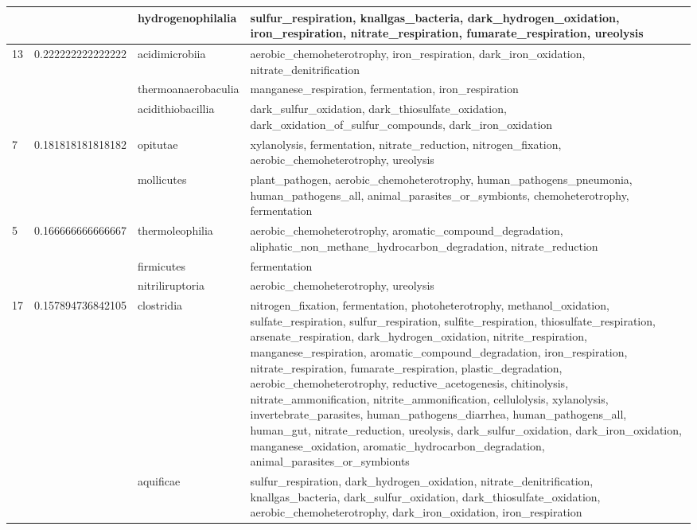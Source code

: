 \documentclass{article}
\begin{document}
\begin{longtable}{|l|c|l|>{\raggedright\arraybackslash}p{6cm}|}
\cline{3-4}
 &  & hydrogenophilalia & sulfur\_respiration, knallgas\_bacteria, dark\_hydrogen\_oxidation, iron\_respiration, nitrate\_respiration, fumarate\_respiration, ureolysis\\
\hline
13 & 0.222222222222222 & acidimicrobiia & aerobic\_chemoheterotrophy, iron\_respiration, dark\_iron\_oxidation, nitrate\_denitrification\\
\cline{3-4}
 &  & thermoanaerobaculia & manganese\_respiration, fermentation, iron\_respiration\\
\cline{3-4}
 &  & acidithiobacillia & dark\_sulfur\_oxidation, dark\_thiosulfate\_oxidation, dark\_oxidation\_of\_sulfur\_compounds, dark\_iron\_oxidation\\
\hline
7 & 0.181818181818182 & opitutae & xylanolysis, fermentation, nitrate\_reduction, nitrogen\_fixation, aerobic\_chemoheterotrophy, ureolysis\\
\cline{3-4}
 &  & mollicutes & plant\_pathogen, aerobic\_chemoheterotrophy, human\_pathogens\_pneumonia, human\_pathogens\_all, animal\_parasites\_or\_symbionts, chemoheterotrophy, fermentation\\
\hline
5 & 0.166666666666667 & thermoleophilia & aerobic\_chemoheterotrophy, aromatic\_compound\_degradation, aliphatic\_non\_methane\_hydrocarbon\_degradation, nitrate\_reduction\\
\cline{3-4}
 &  & firmicutes & fermentation\\
\cline{3-4}
 &  & nitriliruptoria & aerobic\_chemoheterotrophy, ureolysis\\
\hline
17 & 0.157894736842105 & clostridia & nitrogen\_fixation, fermentation, photoheterotrophy, methanol\_oxidation, sulfate\_respiration, sulfur\_respiration, sulfite\_respiration, thiosulfate\_respiration, arsenate\_respiration, dark\_hydrogen\_oxidation, nitrite\_respiration, manganese\_respiration, aromatic\_compound\_degradation, iron\_respiration, nitrate\_respiration, fumarate\_respiration, plastic\_degradation, aerobic\_chemoheterotrophy, reductive\_acetogenesis, chitinolysis, nitrate\_ammonification, nitrite\_ammonification, cellulolysis, xylanolysis, invertebrate\_parasites, human\_pathogens\_diarrhea, human\_pathogens\_all, human\_gut, nitrate\_reduction, ureolysis, dark\_sulfur\_oxidation, dark\_iron\_oxidation, manganese\_oxidation, aromatic\_hydrocarbon\_degradation, animal\_parasites\_or\_symbionts\\
\cline{3-4}
 &  & aquificae & sulfur\_respiration, dark\_hydrogen\_oxidation, nitrate\_denitrification, knallgas\_bacteria, dark\_sulfur\_oxidation, dark\_thiosulfate\_oxidation, aerobic\_chemoheterotrophy, dark\_iron\_oxidation, iron\_respiration\\

\end{longtable}
\end{document}
